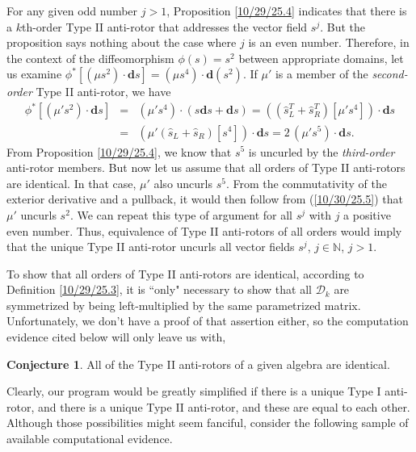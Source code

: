 \documentclass{amsart}
\theoremstyle{definition}
\newtheorem{conjecture}[theorem]{Conjecture}
\numberwithin{theorem}{section}
\numberwithin{equation}{section}
\begin{document}
For any given odd number $j>1$, Proposition \ref{10/29/25.4} indicates that there is a $k$th-order Type II anti-rotor that addresses the vector field $s^j$.  But the proposition says nothing about the case where $j$ is an even number.  Therefore, in the context of the diffeomorphism $\phi(s)=s^2$ between appropriate domains, let us examine $\phi^* \left[(\mu s^2)\cdot\mathbf{d}s\right] =  (\mu s^4)\cdot \mathbf{d}(s^2)$.  If $\mu'$ is a member of the {\it second-order} Type II anti-rotor, we have  
\begin{eqnarray} \nonumber \phi^* \left[(\mu' s^2)\cdot\mathbf{d}s\right]  &=& (\mu' s^4)\cdot (s\mathbf{d}s+\mathbf{d}s) = \left((\hat{s}^T_L+\hat{s}_R^T) [\mu' s^4]\right)\cdot\mathbf{d}s \\  &=& (\mu'(\hat{s}_L+\hat{s}_R)[s^4])\cdot\mathbf{d}s =  2\, (\mu' s^5) \cdot \mathbf{d}s. \label{10/30/25.5}\end{eqnarray} 
From Proposition \ref{10/29/25.4}, we know that $s^5$ is uncurled by the {\it third-order} anti-rotor members.  But now let us assume that all orders of Type II anti-rotors are identical.  In that case, $\mu'$ also uncurls $s^5$.  From the commutativity of the exterior derivative and a pullback, it would then follow from (\ref{10/30/25.5}) that $\mu'$ uncurls $s^2$.  We can repeat this type of argument for all $s^j$ with $j$ a positive even number.  Thus, equivalence of Type II anti-rotors of all orders would imply that the unique Type II anti-rotor uncurls all vector fields $s^j$, $j\in\mathbb{N}$, $j>1$.

To show that all orders of Type II anti-rotors are identical, according to Definition \ref{10/29/25.3}, it is ``only" necessary to show that all $\mathcal{D}_k$ are symmetrized by being left-multiplied by the same parametrized matrix.  Unfortunately, we don't have a proof of that assertion either, so the computation evidence cited below will only leave us with,

\begin{conjecture}\label{10/30/25.6} All of the Type II anti-rotors of a given algebra are identical. \end{conjecture}

 Clearly, our program would be greatly simplified if there is a unique Type I anti-rotor, and there is a unique Type II anti-rotor, and these are equal to each other.  Although those possibilities might seem fanciful, consider the following sample of available computational evidence.  
\end{document}
